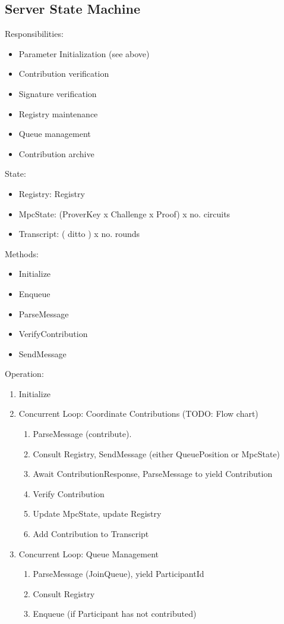 \subsection{Server State Machine}
Responsibilities:
\begin{itemize}
    \item Parameter Initialization (see above)
    \item Contribution verification
    \item Signature verification 
    \item Registry maintenance
    \item Queue management
    \item Contribution archive 
\end{itemize}
State: 
\begin{itemize}
    \item Registry: Registry
    \item MpcState: (ProverKey x Challenge x Proof) x no. circuits
    \item Transcript: ( ditto ) x no. rounds
\end{itemize}
Methods:
\begin{itemize}
    \item Initialize
    \item Enqueue 
    \item ParseMessage
    \item VerifyContribution
    \item SendMessage
\end{itemize}
Operation:
\begin{enumerate}
    \item Initialize
    \item Concurrent Loop: Coordinate Contributions (TODO: Flow chart)
    \begin{enumerate}
        \item ParseMessage (contribute). 
        \item Consult Registry, SendMessage (either QueuePosition or MpcState) 
        \item Await ContributionResponse, ParseMessage to yield Contribution
        \item Verify Contribution 
        \item Update MpcState, update Registry
        \item Add Contribution to Transcript
    \end{enumerate}
    \item Concurrent Loop: Queue Management
    \begin{enumerate}
        \item ParseMessage (JoinQueue), yield ParticipantId
        \item Consult Registry
        \item Enqueue (if Participant has not contributed)
    \end{enumerate}
\end{enumerate}

